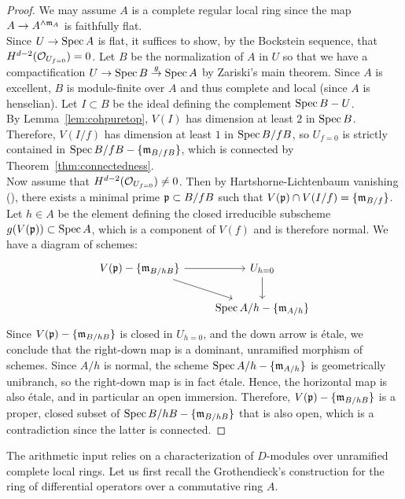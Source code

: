 \begin{proof}
We may assume $A$ is a complete regular local ring since the map $A \to A^{\wedge \ideal{m}_A}$ is faithfully flat.\\
\indent Since $U \to \spec{A}$ is flat, it suffices to show, by the Bockstein sequence, that $H^{d-2}(\cal{O}_{U_{f=0}}) = 0$.
Let $B$ be the normalization of $A$ in $U$ so that we have
a compactification $U \to \spec{B} \stackrel{g}{\to} \spec{A}$ by Zariski's main theorem. Since $A$ is excellent, $B$ is module-finite over $A$ 
and thus complete and local (since $A$ is henselian). 
Let $I \subset B$ be the ideal defining the complement $\spec{B} - U$.\\
\indent By Lemma~\ref{lem:cohpuretop}, $V(I)$ has dimension at least $2$ in $\spec{B}$. Therefore, $V(I/f)$ has dimension at least $1$ in $\spec{B/fB}$, so $U_{f=0}$ is strictly contained in $\spec{B/fB} - \{\ideal{m}_{B/fB}\}$,
 which is connected by Theorem~\ref{thm:connectedness}.\\
 \indent Now assume that $H^{d-2}(\cal{O}_{U_{f=0}}) \neq 0$. 
 Then by Hartshorne-Lichtenbaum vanishing (\cite[0EB7]{sp}), there exists a minimal prime $\ideal{p} \subset B/fB$ such that $V(\ideal{p}) \cap V(I/f) = \{\ideal{m}_{B/f}\}$.
 Let $h\in A$ be the element defining the closed irreducible subscheme $g(V(\ideal{p})) \subset \spec{A}$, which is a component of $V(f)$ and is therefore normal.
 We have a diagram of schemes:
\[\begin{tikzcd}
V(\ideal{p}) - \{\ideal{m}_{B/hB}\} \arrow[rd] \arrow[r] & U_{h=0} \arrow[d] \\
& \spec{A/h} - \{\ideal{m}_{A/h}\} \end{tikzcd}\]
Since $V(\ideal{p}) - \{\ideal{m}_{B/hB}\}$ is closed in $U_{h=0}$, and the down arrow is \'{e}tale, we conclude that
the right-down map is a dominant, unramified morphism of schemes. Since $A/h$ is normal, the scheme
$\spec{A/h} - \{\ideal{m}_{A/h}\}$ is geometrically unibranch, so the right-down map is in fact \'{e}tale. Hence, the horizontal map is also \'{e}tale, and in particular
an open immersion. Therefore, $V(\ideal{p}) - \{\ideal{m}_{B/hB}\}$ is a proper, closed subset of $\spec{B/hB} - \{\ideal{m}_{B/hB}\}$ that is also open, 
which is a contradiction since the latter is connected.
\end{proof}
The arithmetic input relies on a characterization of $D$-modules over unramified complete local rings. Let us first recall
the Grothendieck's construction for the ring of differential operators over a commutative ring $A$.
